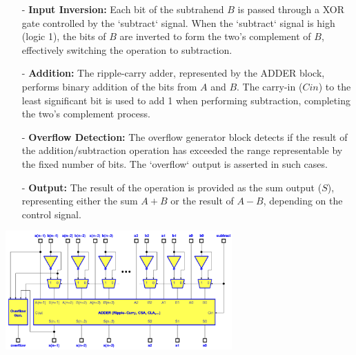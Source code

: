 \begin{itemize}
    \item[-] \textbf{Input Inversion:} Each bit of the subtrahend $B$ is passed through a XOR gate controlled by the `subtract` signal. When the `subtract` signal is high (logic 1), the bits of $B$ are inverted to form the two's complement of $B$, effectively switching the operation to subtraction.
    
    \item[-] \textbf{Addition:} The ripple-carry adder, represented by the ADDER block, performs binary addition of the bits from $A$ and $B$. The carry-in ($Cin$) to the least significant bit is used to add 1 when performing subtraction, completing the two's complement process.
    
    \item[-] \textbf{Overflow Detection:} The overflow generator block detects if the result of the addition/subtraction operation has exceeded the range representable by the fixed number of bits. The `overflow` output is asserted in such cases.
    
    \item[-] \textbf{Output:} The result of the operation is provided as the sum output ($S$), representing either the sum $A + B$ or the result of $A - B$, depending on the control signal.
\end{itemize}

\begin{center}
    \includegraphics[width=0.65\textwidth]{chapters/chapter1e/images/adder_substractor.png}
\end{center}


